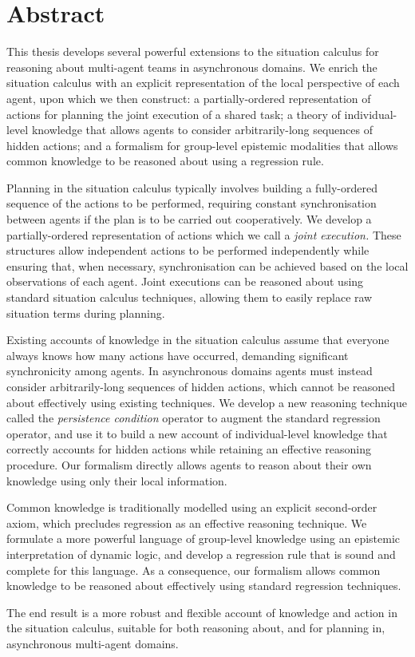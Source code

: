 

\chapter*{Abstract}

This thesis develops several powerful extensions to the situation
calculus for reasoning about multi-agent teams in asynchronous domains.
We enrich the situation calculus with an explicit representation of
the local perspective of each agent, upon which we then construct:
 a partially-ordered
representation of actions for planning the joint execution of a shared
task; a theory of individual-level knowledge that allows agents to
consider arbitrarily-long sequences of hidden actions; and a formalism
for group-level epistemic modalities that allows common knowledge to be
reasoned about using a regression rule.

Planning in the situation calculus typically involves building
a fully-ordered sequence of the actions to be performed, requiring
constant synchronisation between agents if the plan is to be carried
out cooperatively. We develop a partially-ordered representation of
actions which we call a \emph{joint execution.} These structures allow
independent actions to be performed independently while ensuring that,
when necessary, synchronisation can be achieved based on the local
observations of each agent. Joint executions can be reasoned about
using standard situation calculus techniques, allowing them to easily
replace raw situation terms during planning.

Existing accounts of knowledge in the situation calculus assume that
everyone always knows how many actions have occurred, demanding significant
synchronicity among agents. In asynchronous domains agents must instead
consider arbitrarily-long sequences of hidden actions, which cannot
be reasoned about effectively using existing techniques. We develop
a new reasoning technique called the \emph{persistence condition}
operator to augment the standard regression operator, and use it to
build a new account of individual-level knowledge that correctly accounts
for hidden actions while retaining an effective reasoning procedure.
Our formalism directly allows agents to reason about their own knowledge
using only their local information.

Common knowledge is traditionally modelled using an explicit second-order
axiom, which precludes regression as an effective reasoning technique.
We formulate a more powerful language of group-level knowledge using
an epistemic interpretation of dynamic logic, and develop a regression
rule that is sound and complete for this language. As a consequence,
our formalism allows common knowledge to be reasoned about effectively
using standard regression techniques.

The end result is a more robust and flexible account of knowledge
and action in the situation calculus, suitable for both reasoning about, and
for planning in, asynchronous multi-agent domains.
